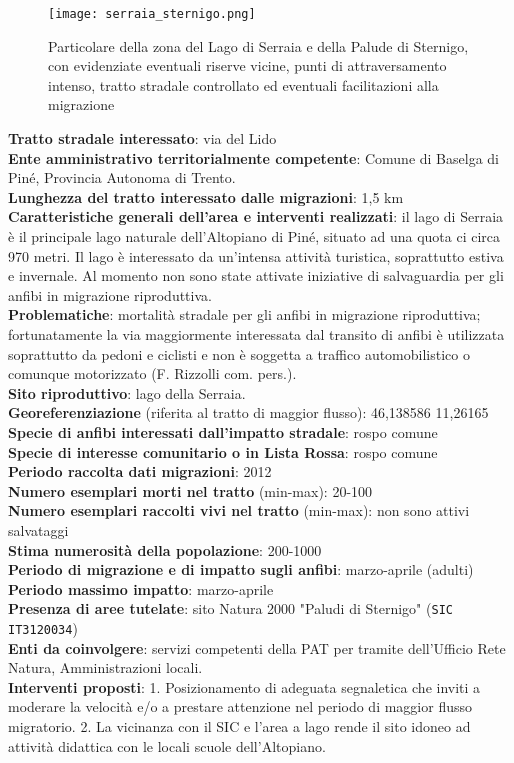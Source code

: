 \documentclass[11pt,a4paper,twoside]{memoir}
\begin{document}
\begin{figure}[H]
\label{fig:map_serraia}
\centering
  \texttt{[image: serraia\_sternigo.png]}
\caption{Particolare della zona del Lago di Serraia e della Palude di Sternigo, con evidenziate eventuali riserve vicine, punti di attraversamento intenso, tratto stradale controllato ed eventuali facilitazioni alla migrazione}
\end{figure}

\textbf{Tratto stradale interessato}: via del Lido \\
\textbf{Ente amministrativo territorialmente competente}: Comune di Baselga di Piné, Provincia Autonoma di Trento.  \\
\textbf{Lunghezza del tratto interessato dalle migrazioni}: 1,5 km  \\
\textbf{Caratteristiche generali dell’area e interventi realizzati}: il lago di Serraia è il principale lago naturale dell'Altopiano di Piné, situato ad una quota ci circa 970 metri. Il lago è interessato da un'intensa attività turistica, soprattutto estiva e invernale. Al momento non sono state attivate iniziative di salvaguardia per gli anfibi in migrazione riproduttiva. \\
\textbf{Problematiche}: mortalità stradale per gli anfibi in migrazione riproduttiva; fortunatamente la via maggiormente interessata dal transito di anfibi è utilizzata soprattutto da pedoni e ciclisti e non è soggetta a traffico automobilistico o comunque motorizzato (F. Rizzolli com. pers.). \\
\textbf{Sito riproduttivo}: lago della Serraia. \\
\textbf{Georeferenziazione} (riferita al tratto di maggior flusso): 46,138586 11,26165  \\
\textbf{Specie di anfibi interessati dall’impatto stradale}: rospo comune  \\
\textbf{Specie di interesse comunitario o in Lista Rossa}: rospo comune  \\
\textbf{Periodo raccolta dati migrazioni}: 2012 \\
\textbf{Numero esemplari morti nel tratto} (min-max): 20-100  \\
\textbf{Numero esemplari raccolti vivi nel tratto} (min-max): non sono attivi salvataggi \\
\textbf{Stima numerosità della popolazione}: 200-1000 \\
\textbf{Periodo di migrazione e di impatto sugli anfibi}: marzo-aprile (adulti) \\
\textbf{Periodo massimo impatto}: marzo-aprile \\
\textbf{Presenza di aree tutelate}: sito Natura 2000 "Paludi di Sternigo" (\texttt{SIC IT3120034}) \\
\textbf{Enti da coinvolgere}: servizi competenti della PAT per tramite dell’Ufficio Rete Natura, Amministrazioni locali. \\
\textbf{Interventi proposti}: 1. Posizionamento di adeguata segnaletica che inviti a moderare la velocità e/o a prestare attenzione nel periodo di maggior flusso migratorio. 2. La vicinanza con il SIC e l’area a lago rende il sito idoneo ad attività didattica con le locali scuole dell’Altopiano. \\
\end{document}
